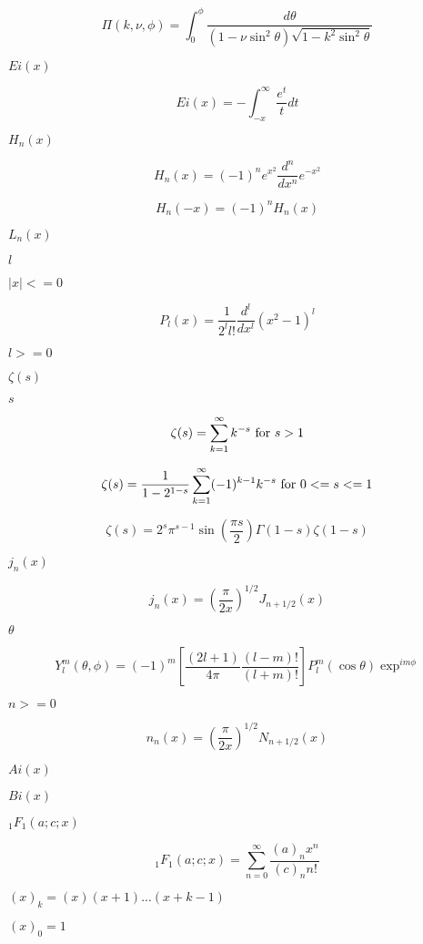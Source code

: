 \documentclass{article}
\begin{document}
\[
  \Pi(k,\nu,\phi) = \int_0^{\phi}
             \frac{d\theta}
             {(1 - \nu \sin^2\theta)
              \sqrt{1 - k^2 \sin^2\theta}}
\]
\pagebreak

$ Ei(x) $
\pagebreak

\[
  Ei(x) = -\int_{-x}^\infty \frac{e^t}{t} dt
\]
\pagebreak

$ H_n(x) $
\pagebreak

\[
  H_n(x) = (-1)^n e^{x^2} \frac{d^n}{dx^n} e^{-x^2}
\]
\pagebreak

\[
  H_n(-x) = (-1)^n H_n(x)
\]
\pagebreak

$ L_n(x) $
\pagebreak

$ l $
\pagebreak

$ |x| <= 0 $
\pagebreak

\[
  P_l(x) = \frac{1}{2^l l!}\frac{d^l}{dx^l}(x^2 - 1)^{l}
\]
\pagebreak

$ l >= 0 $
\pagebreak

$ \zeta(s) $
\pagebreak

$ s $
\pagebreak

\[
    \zeta(s) = \sum_{k=1}^{\infty} k^{-s} \hbox{ for } s > 1
\]
\pagebreak

\[
    \zeta(s) = \frac{1}{1-2^{1-s}}\sum_{k=1}^{\infty}(-1)^{k-1}k^{-s}
             \hbox{ for } 0 <= s <= 1
\]
\pagebreak

\[
    \zeta(s) = 2^s \pi^{s-1} \sin(\frac{\pi s}{2}) \Gamma(1-s) \zeta(1-s)
\]
\pagebreak

$ j_n(x) $
\pagebreak

\[
 j_n(x) = \left(\frac{\pi}{2x} \right) ^{1/2} J_{n+1/2}(x)
\]
\pagebreak

$ \theta $
\pagebreak

\[
 Y_l^m(\theta,\phi) = (-1)^m[\frac{(2l+1)}{4\pi}
                             \frac{(l-m)!}{(l+m)!}]
                  P_l^m(\cos\theta) \exp^{im\phi}
\]
\pagebreak

$ n >= 0 $
\pagebreak

\[
   n_n(x) = \left(\frac{\pi}{2x} \right) ^{1/2} N_{n+1/2}(x)
\]
\pagebreak

$ Ai(x) $
\pagebreak

$ Bi(x) $
\pagebreak

$ {}_1F_1(a;c;x) $
\pagebreak

\[
   {}_1F_1(a;c;x) = \sum_{n=0}^{\infty} \frac{(a)_n x^n}{(c)_n n!}
\]
\pagebreak

$ (x)_k = (x)(x+1)...(x+k-1) $
\pagebreak

$ (x)_0 = 1 $
\pagebreak
\end{document}
